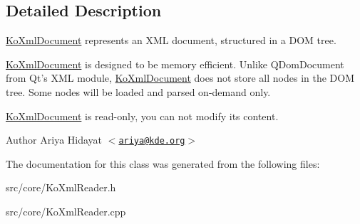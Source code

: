 \subsection{Detailed Description}
\hyperlink{classKoXmlDocument}{KoXmlDocument} represents an XML document, structured in a DOM tree.

\hyperlink{classKoXmlDocument}{KoXmlDocument} is designed to be memory efficient. Unlike QDomDocument from Qt's XML module, \hyperlink{classKoXmlDocument}{KoXmlDocument} does not store all nodes in the DOM tree. Some nodes will be loaded and parsed on-\/demand only.

\hyperlink{classKoXmlDocument}{KoXmlDocument} is read-\/only, you can not modify its content.

\begin{DoxyAuthor}{Author}
Ariya Hidayat $<$\href{mailto:ariya@kde.org}{\tt ariya@kde.org}$>$ 
\end{DoxyAuthor}


The documentation for this class was generated from the following files:\begin{DoxyCompactItemize}
\item 
src/core/KoXmlReader.h\item 
src/core/KoXmlReader.cpp\end{DoxyCompactItemize}
